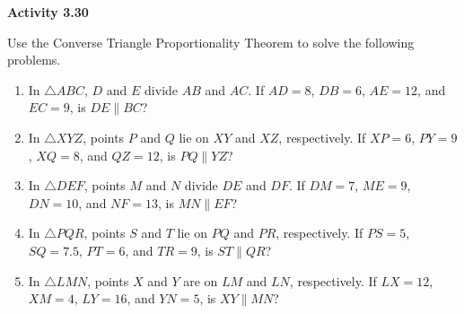 \vspace{0.3ex}
\noindent\textbf{Activity 3.30}

\vspace{0.2ex}

Use the Converse Triangle Proportionality Theorem to solve the following problems.

\begin{enumerate}[label=\color{blue}\arabic*.]
    \item In \(\triangle ABC\), \(D\) and \(E\) divide \(AB\) and \(AC\). If \(AD = 8\), \(DB = 6\), \(AE = 12\), and \(EC = 9\), is \(DE \parallel BC\)?
    \item In \(\triangle XYZ\), points \(P\) and \(Q\) lie on \(XY\) and \(XZ\), respectively. If \(XP = 6\), \(PY = 9\), \(XQ = 8\), and \(QZ = 12\), is \(PQ \parallel YZ\)?
    \item In \(\triangle DEF\), points \(M\) and \(N\) divide \(DE\) and \(DF\). If \(DM = 7\), \(ME = 9\), \(DN = 10\), and \(NF = 13\), is \(MN \parallel EF\)?
    \item In \(\triangle PQR\), points \(S\) and \(T\) lie on \(PQ\) and \(PR\), respectively. If \(PS = 5\), \(SQ = 7.5\), \(PT = 6\), and \(TR = 9\), is \(ST \parallel QR\)?
    \item In \(\triangle LMN\), points \(X\) and \(Y\) are on \(LM\) and \(LN\), respectively. If \(LX = 12\), \(XM = 4\), \(LY = 16\), and \(YN = 5\), is \(XY \parallel MN\)?
\end{enumerate}
